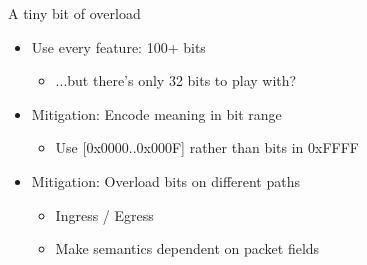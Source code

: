 \documentclass[black,white,aspectratio=169]{beamer}
\DeclareRobustCommand{\#}{\adjustbox{valign=B,totalheight=.57\baselineskip}{\oldhash}}%
\newcommand\todo[1]{
    \textcolor{red}{#1}
}
\begin{document}

    \begin{frame}{A tiny bit of overload}
        \begin{itemize}
            \item Use every feature: 100+ bits~\smallskip
            \begin{itemize}
                \item ...but there's only 32 bits to play with?~\smallskip
            \end{itemize}
            \item Mitigation: Encode meaning in bit range~\smallskip
            \begin{itemize}
                \item Use [0x0000..0x000F] rather than bits in 0xFFFF~\medskip
            \end{itemize}
            \item Mitigation: Overload bits on different paths~\smallskip
            \begin{itemize}
                \item Ingress / Egress~\smallskip
                \item Make semantics dependent on packet fields~\medskip
            \end{itemize}
        \end{itemize}
    \end{frame}
\end{document}
